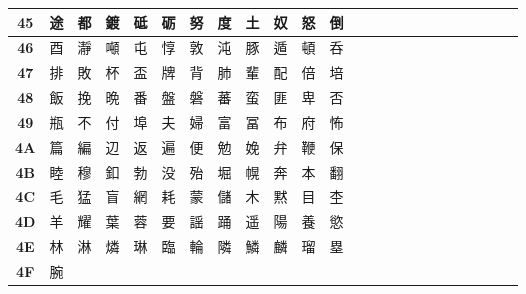 \begin{table}[H]
{\begin{tabular}{|Sc|Sc|Sc|Sc|Sc|Sc|Sc|Sc|Sc|Sc|Sc|Sc|}
\textbf{45} & 途 & 都 & 鍍 & 砥 & 砺 & 努 & 度 & 土 & 奴 & 怒 & 倒 \\ \hline
\textbf{46} & 酉 & 瀞 & 噸 & 屯 & 惇 & 敦 & 沌 & 豚 & 遁 & 頓 & 呑 \\ \hline
\textbf{47} & 排 & 敗 & 杯 & 盃 & 牌 & 背 & 肺 & 輩 & 配 & 倍 & 培 \\ \hline
\textbf{48} & 飯 & 挽 & 晩 & 番 & 盤 & 磐 & 蕃 & 蛮 & 匪 & 卑 & 否 \\ \hline
\textbf{49} & 瓶 & 不 & 付 & 埠 & 夫 & 婦 & 富 & 冨 & 布 & 府 & 怖 \\ \hline
\textbf{4A} & 篇 & 編 & 辺 & 返 & 遍 & 便 & 勉 & 娩 & 弁 & 鞭 & 保 \\ \hline
\textbf{4B} & 睦 & 穆 & 釦 & 勃 & 没 & 殆 & 堀 & 幌 & 奔 & 本 & 翻 \\ \hline
\textbf{4C} & 毛 & 猛 & 盲 & 網 & 耗 & 蒙 & 儲 & 木 & 黙 & 目 & 杢 \\ \hline
\textbf{4D} & 羊 & 耀 & 葉 & 蓉 & 要 & 謡 & 踊 & 遥 & 陽 & 養 & 慾 \\ \hline
\textbf{4E} & 林 & 淋 & 燐 & 琳 & 臨 & 輪 & 隣 & 鱗 & 麟 & 瑠 & 塁 \\ \hline
\textbf{4F} & 腕 &  &  &  &  &  &  &  &  &  &  \\ \hline
\end{tabular}
}
\end{table}

